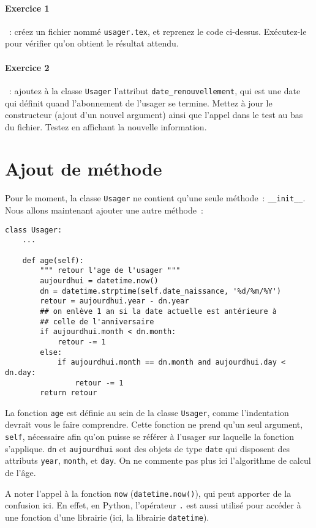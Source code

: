\documentclass{article}
\begin{document}
\paragraph{Exercice 1}~: créez un fichier nommé \texttt{usager.tex}, et reprenez le code ci-dessus. Exécutez-le pour vérifier qu'on obtient le résultat attendu.


\paragraph{Exercice 2}~: ajoutez à la classe \texttt{Usager} l'attribut \texttt{date\_renouvellement}, qui est une date qui définit quand l'abonnement de l'usager se termine. Mettez à jour le constructeur (ajout d'un nouvel argument) ainsi que l'appel dans le test au bas du fichier. Testez en affichant la nouvelle information.

\section{Ajout de méthode}

Pour le moment, la classe \texttt{Usager} ne contient qu'une seule méthode~: \texttt{\_\_init\_\_}. Nous allons maintenant ajouter une autre méthode~:

\begin{verbatim}
class Usager:
    ...
    
    def age(self):
        """ retour l'age de l'usager """
        aujourdhui = datetime.now()
        dn = datetime.strptime(self.date_naissance, '%d/%m/%Y')
        retour = aujourdhui.year - dn.year
        ## on enlève 1 an si la date actuelle est antérieure à
        ## celle de l'anniversaire
        if aujourdhui.month < dn.month:
            retour -= 1
        else:
            if aujourdhui.month == dn.month and aujourdhui.day < dn.day:
                retour -= 1
        return retour
\end{verbatim}

La fonction \texttt{age} est définie au sein de la classe \texttt{Usager}, comme l'indentation devrait vous le faire comprendre. Cette fonction ne prend qu'un seul argument, \texttt{self}, nécessaire afin qu'on puisse se référer à l'usager sur laquelle la fonction s'applique. \texttt{dn} et \texttt{aujourdhui} sont des objets de type \texttt{date} qui disposent des attributs \texttt{year}, \texttt{month}, et \texttt{day}. On ne commente pas plus ici l'algorithme de calcul de l'âge. 

A noter l'appel à la fonction \texttt{now} (\texttt{datetime.now()}), qui peut apporter de la confusion ici. En effet, en Python, l'opérateur \texttt{.} est aussi utilisé pour accéder à une fonction d'une librairie (ici, la librairie \texttt{datetime}).
\end{document}
